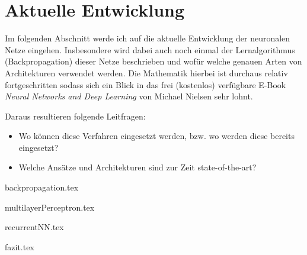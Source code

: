 \part{Aktuelle Entwicklung}

Im folgenden Abschnitt werde ich auf die aktuelle Entwicklung der neuronalen Netze eingehen. Insbesondere wird dabei auch noch einmal der Lernalgorithmus (Backpropagation) dieser Netze beschrieben und wofür welche genauen Arten von Architekturen verwendet werden. Die Mathematik hierbei ist durchaus relativ fortgeschritten sodass sich ein Blick in das frei (kostenlos) verfügbare E-Book \emph{Neural Networks and Deep Learning} von Michael Nielsen \cite{dlnielsen} sehr lohnt. 

Daraus resultieren folgende Leitfragen: 

\begin{itemize}
\item Wo können diese Verfahren eingesetzt werden, bzw. wo werden diese bereits eingesetzt?
\item Welche Ansätze und Architekturen sind zur Zeit state-of-the-art?
\end{itemize}

{backpropagation.tex}
\clearpage

{multilayerPerceptron.tex}
\clearpage

{recurrentNN.tex}
\clearpage

{fazit.tex}
\clearpage

